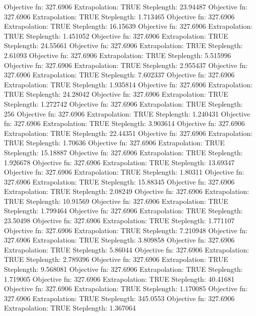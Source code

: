 \documentclass{article}
\begin{document}
\begin{Schunk}
\begin{Soutput}
Objective fn:  327.6906   Extrapolation:  TRUE   Steplength:  23.94487 
Objective fn:  327.6906   Extrapolation:  TRUE   Steplength:  1.713465 
Objective fn:  327.6906   Extrapolation:  TRUE   Steplength:  16.15639 
Objective fn:  327.6906   Extrapolation:  TRUE   Steplength:  1.451052 
Objective fn:  327.6906   Extrapolation:  TRUE   Steplength:  24.55661 
Objective fn:  327.6906   Extrapolation:  TRUE   Steplength:  2.61093 
Objective fn:  327.6906   Extrapolation:  TRUE   Steplength:  5.515996 
Objective fn:  327.6906   Extrapolation:  TRUE   Steplength:  2.955437 
Objective fn:  327.6906   Extrapolation:  TRUE   Steplength:  7.602337 
Objective fn:  327.6906   Extrapolation:  TRUE   Steplength:  1.935814 
Objective fn:  327.6906   Extrapolation:  TRUE   Steplength:  24.28042 
Objective fn:  327.6906   Extrapolation:  TRUE   Steplength:  1.272742 
Objective fn:  327.6906   Extrapolation:  TRUE   Steplength:  256 
Objective fn:  327.6906   Extrapolation:  TRUE   Steplength:  1.240431 
Objective fn:  327.6906   Extrapolation:  TRUE   Steplength:  3.903614 
Objective fn:  327.6906   Extrapolation:  TRUE   Steplength:  22.44351 
Objective fn:  327.6906   Extrapolation:  TRUE   Steplength:  1.70636 
Objective fn:  327.6906   Extrapolation:  TRUE   Steplength:  15.18887 
Objective fn:  327.6906   Extrapolation:  TRUE   Steplength:  1.926678 
Objective fn:  327.6906   Extrapolation:  TRUE   Steplength:  13.69347 
Objective fn:  327.6906   Extrapolation:  TRUE   Steplength:  1.80311 
Objective fn:  327.6906   Extrapolation:  TRUE   Steplength:  15.88345 
Objective fn:  327.6906   Extrapolation:  TRUE   Steplength:  2.08249 
Objective fn:  327.6906   Extrapolation:  TRUE   Steplength:  10.91569 
Objective fn:  327.6906   Extrapolation:  TRUE   Steplength:  1.799464 
Objective fn:  327.6906   Extrapolation:  TRUE   Steplength:  23.50498 
Objective fn:  327.6906   Extrapolation:  TRUE   Steplength:  1.771107 
Objective fn:  327.6906   Extrapolation:  TRUE   Steplength:  7.210948 
Objective fn:  327.6906   Extrapolation:  TRUE   Steplength:  3.809858 
Objective fn:  327.6906   Extrapolation:  TRUE   Steplength:  5.86044 
Objective fn:  327.6906   Extrapolation:  TRUE   Steplength:  2.789396 
Objective fn:  327.6906   Extrapolation:  TRUE   Steplength:  9.568081 
Objective fn:  327.6906   Extrapolation:  TRUE   Steplength:  1.719005 
Objective fn:  327.6906   Extrapolation:  TRUE   Steplength:  40.41681 
Objective fn:  327.6906   Extrapolation:  TRUE   Steplength:  1.170085 
Objective fn:  327.6906   Extrapolation:  TRUE   Steplength:  345.0553 
Objective fn:  327.6906   Extrapolation:  TRUE   Steplength:  1.367064 

\end{Soutput}
\end{Schunk}
\end{document}
